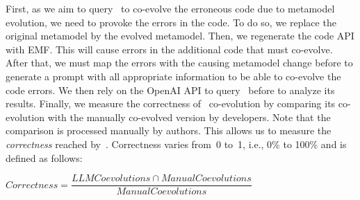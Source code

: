 First, as we aim to query \LLM~to co-evolve the erroneous code due to metamodel evolution, we need to provoke the errors in the code. To do so, we replace the original metamodel by the evolved metamodel. Then, we regenerate the code API with EMF. This will cause errors in the additional code that must co-evolve. 
%
After that, we must map the errors with the causing metamodel change before to generate a prompt with all appropriate information to be able to co-evolve the code errors. We then rely on the OpenAI API to query \LLM~before to analyze its results. 
%
%
Finally, we measure the correctness of \LLM~co-evolution by comparing its co-evolution with the manually co-evolved version by developers. Note that the comparison is processed manually by authors. This allows us to measure the \emph{correctness} reached by~\LLM. %
Correctness varies from~0 to~1, i.e., 0\% to 100\% and is defined as follows:
\vspace{0.5em}

\noindent $ Correctness = \dfrac{LLM Coevolutions \cap Manual Coevolutions}{Manual Coevolutions} $

\vspace{0.5em}

